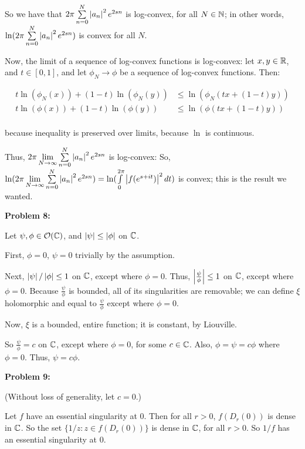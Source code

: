 \documentclass[a4paper,12pt]{article}
\begin{document}
So we have that $2\pi \sum\limits_{n=0}^N \left\lvert a_n \right\rvert^2 e^{2sn}$ is log-convex, for all $N \in \mathbb{N}$; in other words, $\ln(2\pi \sum\limits_{n=0}^N \left\lvert a_n \right\rvert^2 e^{2sn})$ is convex for all $N$.

Now, the limit of a sequence of log-convex functions is log-convex: let $x,y \in \mathbb{R}$, and $t \in [0,1]$, and let $\phi_N \to \phi$ be a sequence of log-convex functions. Then:

\begin{align*}
t\ln(\phi_N(x)) + (1-t)\ln(\phi_N(y)) &\leq \ln(\phi_N(tx+(1-t)y))\\
t\ln(\phi(x)) + (1-t)\ln(\phi(y)) &\leq \ln(\phi(tx+(1-t)y))\\
\end{align*}

because inequality is preserved over limits, because $\ln$ is continuous.

Thus, $2\pi \lim\limits_{N \to \infty}\sum\limits_{n=0}^N \left\lvert a_n \right\rvert^2 e^{2sn}$ is log-convex: So, $\ln(2\pi \lim\limits_{N \to \infty}\sum\limits_{n=0}^N \left\lvert a_n \right\rvert^2 e^{2sn}) = \ln(\int\limits_0^{2\pi} \left\lvert f(e^{s+it}) \right\rvert^2 dt)$ is convex; this is the result we wanted.

\shunt

{\bf Problem 8:}

Let $\psi, \phi \in \mathcal{O}(\mathbb{C})$, and $\left\lvert \psi \right\rvert \leq \left\lvert \phi \right\rvert$ on $\mathbb{C}$.

First, $\phi = 0$, $\psi = 0$ trivially by the assumption.

Next, $\left\lvert \psi \right\rvert/\left\lvert \phi \right\rvert \leq 1$ on $\mathbb{C}$, except where $\phi = 0$. Thus, $\left\lvert \frac{\psi}{\phi} \right\rvert \leq 1$ on $\mathbb{C}$, except where $\phi = 0$. Because $\frac{\psi}{\phi}$ is bounded, all of its singularities are removable; we can define $\xi$ holomorphic and equal to $\frac{\psi}{\phi}$ except where $\phi = 0$. 

Now, $\xi$ is a bounded, entire function; it is constant, by Liouville.

So $\frac{\psi}{\phi} = c$ on $\mathbb{C}$, except where $\phi = 0$, for some $c \in \mathbb{C}$. Also, $\phi = \psi = c\phi$ where $\phi = 0$. Thus, $\psi = c \phi$.

\shunt

{\bf Problem 9:}

(Without loss of generality, let $c=0$.)

Let $f$ have an essential singularity at $0$. Then for all $r>0$, $f(D_r(0))$ is dense in $\mathbb{C}$. So the set $\{1/z: z \in f(D_r(0))\}$ is dense in $\mathbb{C}$, for all $r >0$. So $1/f$ has an essential singularity at $0$.

\shunt
\end{document}

